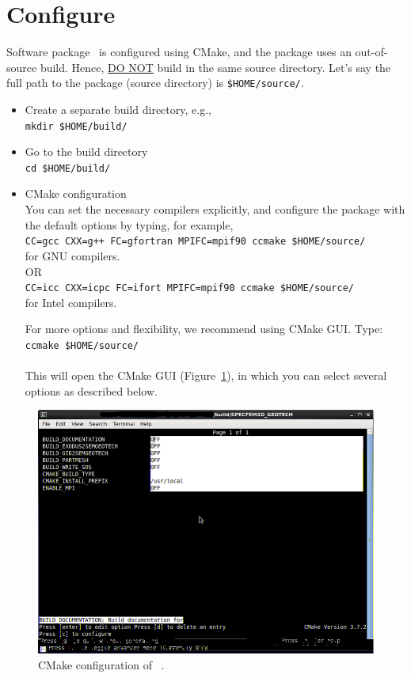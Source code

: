 \section{Configure}
\label{sec:configure}

Software package \pack\ is configured using CMake, and the package uses an out-of-source build. Hence, \underline{DO NOT} build in the same source directory. Let's say the full path to the package (source directory) is \texttt{\$HOME/source/\pack}.

\begin{itemize}
\item Create a separate build directory, e.g.,\\
\texttt{mkdir \$HOME/build/\pack}

\item Go to the build directory \\
\texttt{cd \$HOME/build/\pack}

\item CMake configuration \\
You can set the necessary compilers explicitly, and configure the package with the default options by typing, for example,\\
\texttt{CC=gcc CXX=g++ FC=gfortran MPIFC=mpif90 ccmake \$HOME/source/\pack} \\
for GNU compilers.\\
OR\\
\texttt{CC=icc CXX=icpc FC=ifort MPIFC=mpif90 ccmake \$HOME/source/\pack} \\
for Intel compilers.

For more options and flexibility, we recommend using CMake GUI. Type:\\
\texttt{ccmake \$HOME/source/\pack} \\
\\
This will open the CMake GUI (Figure~\ref{fig:cmake}), in which you can select several options as described below.
\end{itemize}

\begin{figure}[ht]
\centering
\includegraphics[scale=1.0]{cmake}
\caption{CMake configuration of \pack\ .}
\label{fig:cmake}
\end{figure}

